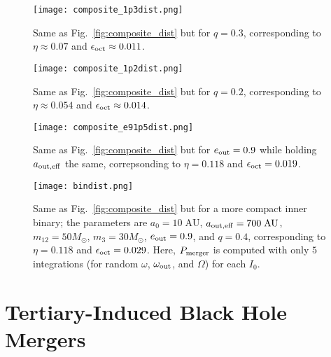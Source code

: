 \documentclass[
        fleqn,
        usenatbib,
    ]{mnras}
\begin{document}
\begin{figure}
    \centering
    \texttt{[image: composite\_1p3dist.png]}
    \caption{Same as Fig.~\ref{fig:composite_dist} but for $q = 0.3$,
    corresponding to $\eta
    \approx 0.07$ and $\epsilon_{\rm oct} \approx 0.011$.}\label{fig:composite_1p3}
\end{figure}
\begin{figure}
    \centering
    \texttt{[image: composite\_1p2dist.png]}
    \caption{Same as Fig.~\ref{fig:composite_dist} but for $q = 0.2$,
    corresponding to $\eta
    \approx 0.054$ and $\epsilon_{\rm oct} \approx 0.014$.
    }\label{fig:composite_1p2}
\end{figure}
\begin{figure}
    \centering
    \texttt{[image: composite\_e91p5dist.png]}
    \caption{Same as Fig.~\ref{fig:composite_dist} but for $e_{\rm out} = 0.9$
    while holding $a_{\rm out, eff}$ the same, correpsonding to $\eta =
    0.118$ and $\epsilon_{\rm oct} = 0.019$. }\label{fig:composite_e91p5}
\end{figure}
\begin{figure}
    \centering
    \texttt{[image: bindist.png]}
    \caption{Same as Fig.~\ref{fig:composite_dist} but for a more compact inner
    binary; the parameters are $a_0 = 10\;\mathrm{AU}$, $a_{\rm out, eff} =
    700\;\mathrm{AU}$, $m_{12} = 50M_{\odot}$, $m_3 = 30M_{\odot}$, $e_{\rm
    out} = 0.9$, and $q = 0.4$, corresponding to $\eta = 0.118$ and
    $\epsilon_{\rm oct} = 0.029$. Here, $P_{\rm merger}$ is computed with
    only $5$ integrations (for random $\omega$, $\omega_{\rm out}$, and
    $\Omega$) for each $I_0$.}\label{fig:composite_bindist}
\end{figure}

\section{Tertiary-Induced Black Hole Mergers}\label{s:with_gw}
\end{document}
